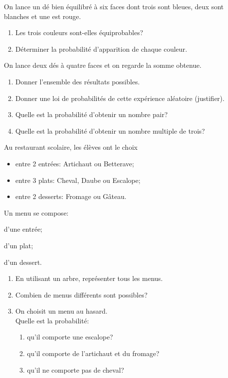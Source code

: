 \begin{exercice}
      On lance un dé bien équilibré à six faces dont trois sont bleues, deux sont 
 blanches et une est rouge.
     \begin{enumerate}
         \item Les trois couleurs sont-elles équiprobables?
         \item Déterminer la probabilité d'apparition de chaque couleur.
     \end{enumerate}
 \end{exercice}
 \begin{exercice}[Dé à 4 faces]
     On lance deux dés à quatre faces et on regarde la somme obtenue.
     \begin{enumerate}
         \item Donner l'ensemble des résultats possibles.
         \item Donner une loi de probabilités de cette expérience 
 aléatoire (justifier).
         \item Quelle est la probabilité d'obtenir un nombre pair?
         \item Quelle est la probabilité d'obtenir un nombre multiple 
 de trois?
     \end{enumerate}
 \end{exercice}

\begin{exercice}[Menus]
Au restaurant scolaire, les élèves ont le choix 
\begin{itemize}
\item entre 2 entrées: Artichaut ou Betterave;
\item entre 3 plats: Cheval, Daube ou Escalope;
\item entre 2 desserts: Fromage ou Gâteau.
\end{itemize}
Un menu se compose:
\begin{colitemize}{3}
\item d'une entrée; \item d'un plat;  \item d'un dessert.
\end{colitemize}
\vspace{-1.5em}
\begin{enumerate}
\item En utilisant un arbre, représenter tous les menus.
\item Combien de menus différents sont possibles?
\item On choisit un menu au hasard. \\ Quelle est la probabilité:
\begin{enumerate}
\item qu'il comporte une escalope?
\item qu'il comporte de l'artichaut et du fromage?
\item qu'il ne comporte pas de cheval?
\end{enumerate}
\end{enumerate}
\end{exercice}

